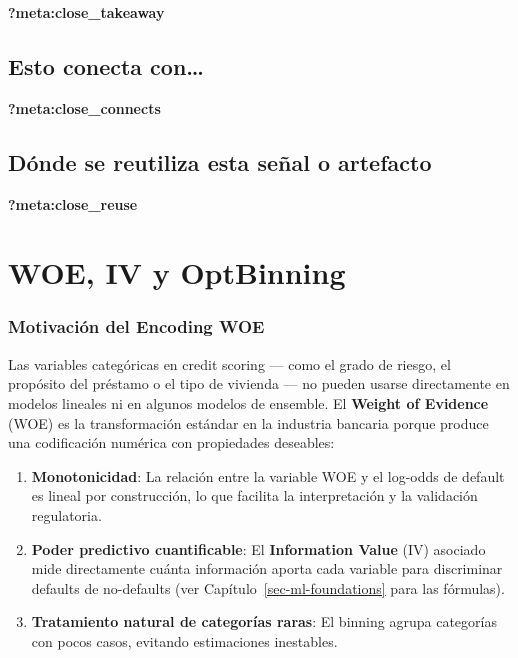 \documentclass[
  spanish,
  11pt,
  letterpaper,
]{scrbook}
\providecommand{\tightlist}{%
  \setlength{\itemsep}{0pt}\setlength{\parskip}{0pt}}
\theoremstyle{plain}
\theoremstyle{remark}
\begin{document}
\begin{tcolorbox}[enhanced jigsaw, arc=.35mm, bottomrule=.15mm, bottomtitle=1mm, breakable, colback=white, colbacktitle=quarto-callout-tip-color!10!white, colframe=quarto-callout-tip-color-frame, coltitle=black, left=2mm, leftrule=.75mm, opacityback=0, opacitybacktitle=0.6, rightrule=.15mm, title=\textcolor{quarto-callout-tip-color}{\faLightbulb}\hspace{0.5em}{Qué debes quedarte}, titlerule=0mm, toprule=.15mm, toptitle=1mm]

\textbf{?meta:close\_takeaway}

\section{Esto conecta con\ldots{}}\label{esto-conecta-con-3}

\textbf{?meta:close\_connects}

\section{Dónde se reutiliza esta señal o
artefacto}\label{duxf3nde-se-reutiliza-esta-seuxf1al-o-artefacto-3}

\textbf{?meta:close\_reuse}

\end{tcolorbox}

\chapter{WOE, IV y OptBinning}\label{sec-woe-iv}

\subsection{Motivación del Encoding
WOE}\label{motivaciuxf3n-del-encoding-woe}

Las variables categóricas en credit scoring --- como el grado de riesgo,
el propósito del préstamo o el tipo de vivienda --- no pueden usarse
directamente en modelos lineales ni en algunos modelos de ensemble. El
\textbf{Weight of Evidence} (WOE) es la transformación estándar en la
industria bancaria porque produce una codificación numérica con
propiedades deseables:

\begin{enumerate}
\def\labelenumi{\arabic{enumi}.}
\tightlist
\item
  \textbf{Monotonicidad}: La relación entre la variable WOE y el
  log-odds de default es lineal por construcción, lo que facilita la
  interpretación y la validación regulatoria.
\item
  \textbf{Poder predictivo cuantificable}: El \textbf{Information Value}
  (IV) asociado mide directamente cuánta información aporta cada
  variable para discriminar defaults de no-defaults (ver
  Capítulo~\ref{sec-ml-foundations} para las fórmulas).
\item
  \textbf{Tratamiento natural de categorías raras}: El binning agrupa
  categorías con pocos casos, evitando estimaciones inestables.
\end{enumerate}
\end{document}
